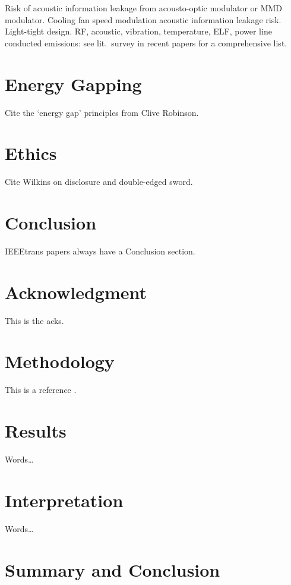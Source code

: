 \documentclass[conference]{IEEEtran}
\begin{document}
Risk of acoustic information leakage from acousto-optic modulator or MMD
modulator. Cooling fan speed modulation acoustic information leakage risk.
Light-tight design. RF, acoustic, vibration, temperature, ELF, power line
conducted emissions: see lit.\ survey in recent papers for a comprehensive
list.

\section{Energy Gapping}

Cite the `energy gap' principles from Clive Robinson.

\section{Ethics}

Cite Wilkins on disclosure and double-edged sword.


\section{Conclusion}

IEEEtrans papers always have a Conclusion section.

\section*{Acknowledgment}

This is the acks.

\section{Methodology}

This is a reference \cite{Loughry2013a}.

\section{Results}

Words\ldots

\section{Interpretation}

Words\ldots

\section{Summary and Conclusion}
\end{document}
